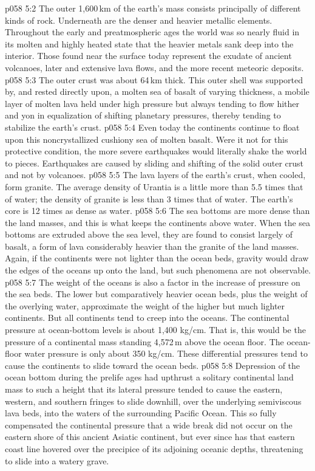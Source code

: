 \vs p058 5:2 The outer 1,600\,km of the earth’s mass consists principally of different kinds of rock. Underneath are the denser and heavier metallic elements. Throughout the early and preatmospheric ages the world was so nearly fluid in its molten and highly heated state that the heavier metals sank deep into the interior. Those found near the surface today represent the exudate of ancient volcanoes, later and extensive lava flows, and the more recent meteoric deposits.
\vs p058 5:3 The outer crust was about 64\,km thick. This outer shell was supported by, and rested directly upon, a molten sea of basalt of varying thickness, a mobile layer of molten lava held under high pressure but always tending to flow hither and yon in equalization of shifting planetary pressures, thereby tending to stabilize the earth’s crust.
\vs p058 5:4 Even today the continents continue to float upon this noncrystallized cushiony sea of molten basalt. Were it not for this protective condition, the more severe earthquakes would literally shake the world to pieces. Earthquakes are caused by sliding and shifting of the solid outer crust and not by volcanoes.
\vs p058 5:5 \pc The lava layers of the earth’s crust, when cooled, form granite. The average density of Urantia is a little more than 5.5 times that of water; the density of granite is less than 3 times that of water. The earth’s core is 12 times as dense as water.
\vs p058 5:6 The sea bottoms are more dense than the land masses, and this is what keeps the continents above water. When the sea bottoms are extruded above the sea level, they are found to consist largely of basalt, a form of lava considerably heavier than the granite of the land masses. Again, if the continents were not lighter than the ocean beds, gravity would draw the edges of the oceans up onto the land, but such phenomena are not observable.
\vs p058 5:7 The weight of the oceans is also a factor in the increase of pressure on the sea beds. The lower but comparatively heavier ocean beds, plus the weight of the overlying water, approximate the weight of the higher but much lighter continents. But all continents tend to creep into the oceans. The continental pressure at ocean\hyp{}bottom levels is about 1,400 kg/cm. That is, this would be the pressure of a continental mass standing 4,572\,m above the ocean floor. The ocean\hyp{}floor water pressure is only about 350 kg/cm. These differential pressures tend to cause the continents to slide toward the ocean beds.
\vs p058 5:8 Depression of the ocean bottom during the prelife ages had upthrust a solitary continental land mass to such a height that its lateral pressure tended to cause the eastern, western, and southern fringes to slide downhill, over the underlying semiviscous lava beds, into the waters of the surrounding Pacific Ocean. This so fully compensated the continental pressure that a wide break did not occur on the eastern shore of this ancient Asiatic continent, but ever since has that eastern coast line hovered over the precipice of its adjoining oceanic depths, threatening to slide into a watery grave.
